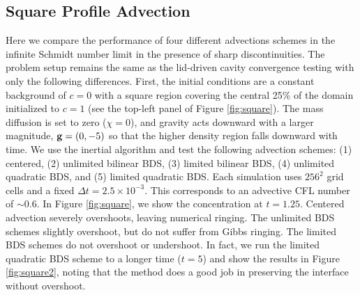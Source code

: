 \documentclass[final]{siamltex}
\def\gb {{\bf g}}
\begin{document}
\subsection{Square Profile Advection}
Here we compare the performance of four different advections schemes in the
infinite Schmidt number limit in the presence of sharp discontinuities.  The problem setup
remains the same as the lid-driven cavity convergence testing with only the following differences.
First, the initial conditions are a constant background of $c=0$ with a square region covering
the central 25\% of the domain initialized to $c=1$ 
(see the top-left panel of Figure \ref{fig:square}).
The mass diffusion is set to zero ($\chi=0$),
and gravity acts downward with a larger magnitude, $\gb=(0,-5)$ so that the higher density
region falls downward with time.
We use the inertial algorithm and test the following advection schemes: (1) centered,
(2) unlimited bilinear BDS, (3) limited bilinear BDS, (4) unlimited quadratic BDS,
and (5) limited quadratic BDS.
Each simulation uses $256^2$ grid cells and a fixed $\Delta t=2.5\times 10^{-3}$.  
This corresponds to an advective CFL number of $\sim 0.6$.
In Figure \ref{fig:square}, we show the concentration at $t=1.25$.
Centered advection
severely overshoots, leaving numerical ringing.  The unlimited BDS
schemes slightly overshoot, but do not suffer from Gibbs ringing.
The limited BDS schemes do not overshoot or undershoot.
In fact, we run the limited quadratic BDS scheme to a longer time ($t=5$)
and show the results in Figure \ref{fig:square2}, noting that the method does a good job in preserving
the interface without overshoot.
\end{document}
